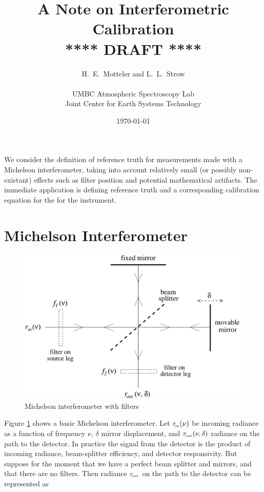 \documentclass[12pt]{article}
\title{A Note on Interferometric Calibration \\
\vspace{3mm}
{****} DRAFT {****} \\
}
\author{H.~E.~Motteler and L.~L.~Strow \\
  \\
  UMBC Atmospheric Spectroscopy Lab \\
  Joint Center for Earth Systems Technology \\
}
\date{\today}
\begin{document}
\maketitle

We consider the definition of reference truth for measurements made
with a Michelson interferometer, taking into account relatively
small (or possibly non-existant) effects such as filter position and
potential mathematical artifacts.  The immediate application is
defining reference truth and a corresponding calibration equation
for the for the {\cris} instrument.



\section{Michelson Interferometer}

\begin{figure}
\begin{center}
  \includegraphics[scale=0.5]{figures/mich_filt2.pdf}
\caption{Michelson interferometer with filters}
\label{intf1}
\end{center}
\end{figure}

Figure \ref{intf1} shows a basic Michelson interferometer.  Let
$r_{\!\mbox{\tiny in}}(\nu)$ be incoming radiance as a function of frequency $\nu$,
$\delta$ mirror displacement, and $r_{\!\mbox{\tiny out}}(\nu, \delta)$ radiance on
the path to the detector.  In practice the signal from the detector
is the product of incoming radiance, beam-splitter efficiency, and
detector responsivity.  But suppose for the moment that we have a
perfect beam splitter and mirrors, and that there are no filters.
Then radiance $r_{\!\mbox{\tiny out}}$ on the path to the detector can be represented
as
\end{document}
